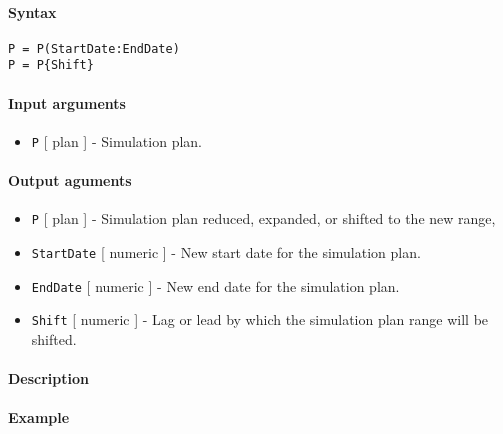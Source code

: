 


	\paragraph{Syntax}

\begin{verbatim}
P = P(StartDate:EndDate)
P = P{Shift}
\end{verbatim}

\paragraph{Input arguments}

\begin{itemize}
\itemsep1pt\parskip0pt
\item
  \texttt{P} {[} plan {]} - Simulation plan.
\end{itemize}

\paragraph{Output aguments}

\begin{itemize}
\item
  \texttt{P} {[} plan {]} - Simulation plan reduced, expanded, or
  shifted to the new range,
\item
  \texttt{StartDate} {[} numeric {]} - New start date for the simulation
  plan.
\item
  \texttt{EndDate} {[} numeric {]} - New end date for the simulation
  plan.
\item
  \texttt{Shift} {[} numeric {]} - Lag or lead by which the simulation
  plan range will be shifted.
\end{itemize}

\paragraph{Description}

\paragraph{Example}


